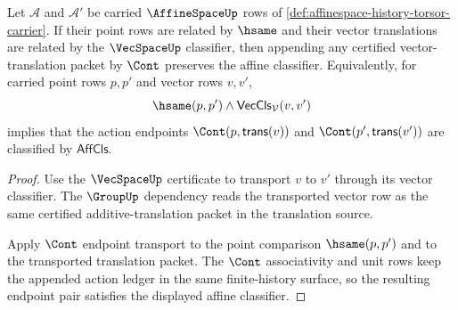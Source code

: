 \begin{theorem}
\label{thm:affinespace-vector-action-stability}
Let $\mathcal{A}$ and $\mathcal{A}'$ be carried $\AffineSpaceUp$ rows of \autoref{def:affinespace-history-torsor-carrier}. If their point rows are related by $\hsame$ and their vector translations are related by the $\VecSpaceUp$ classifier, then appending any certified vector-translation packet by $\Cont$ preserves the affine classifier. Equivalently, for carried point rows $p,p'$ and vector rows $v,v'$,
$$
\hsame(p,p')\land \mathsf{VecCls}_{\mathcal{V}}(v,v')
$$
implies that the action endpoints $\Cont(p,\mathsf{trans}(v))$ and $\Cont(p',\mathsf{trans}(v'))$ are classified by $\mathsf{AffCls}$.
\end{theorem}
\begin{proof}
Use the $\VecSpaceUp$ certificate to transport $v$ to $v'$ through its vector classifier. The $\GroupUp$ dependency reads the transported vector row as the same certified additive-translation packet in the translation source.

Apply $\Cont$ endpoint transport to the point comparison $\hsame(p,p')$ and to the transported translation packet. The $\Cont$ associativity and unit rows keep the appended action ledger in the same finite-history surface, so the resulting endpoint pair satisfies the displayed affine classifier.
\end{proof}

